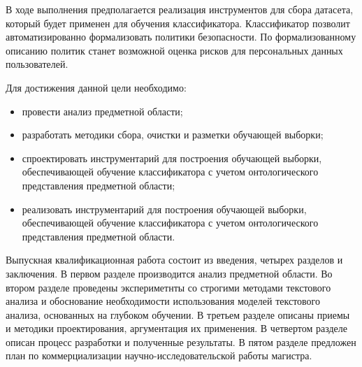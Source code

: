\documentclass[../main]{subfiles}
\begin{document}
В ходе выполнения предполагается реализация инструментов для сбора датасета, который будет применен для обучения классификатора. Классификатор позволит автоматизированно формализовать политики безопасности. По формализованному описанию политик станет возможной оценка рисков для персональных данных пользователей.

Для достижения данной цели необходимо:

\begin{itemize}
    \item провести анализ предметной области;
    \item разработать методики сбора, очистки и разметки обучающей выборки;
    \item спроектировать инструментарий для построения обучающей выборки, обеспечивающей обучение классификатора с учетом онтологического представления предметной области;
    \item реализовать  инструментарий для построения обучающей выборки, обеспечивающей обучение классификатора с учетом онтологического представления предметной области.
\end{itemize}

Выпускная  квалификационная  работа  состоит  из  введения, четырех разделов и заключения. В первом разделе производится анализ предметной области. Во втором разделе проведены экспериметнты со строгими методами текстового анализа и обоснование необходимости использования моделей текстового анализа, основанных на глубоком обучении. В третьем разделе описаны приемы и методики проектирования, аргументация их применения. В четвертом разделе описан процесс разработки и полученные результаты. В пятом разделе предложен план по коммерциализации научно-исследовательской работы магистра.
\end{document}
